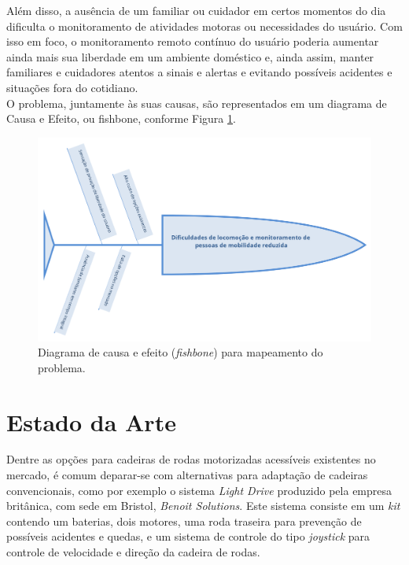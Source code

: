 Além disso, a ausência de um familiar ou cuidador em certos momentos 
do dia 
dificulta o monitoramento de atividades motoras ou necessidades 
do usuário. 
Com isso em foco, o monitoramento remoto contínuo do usuário 
poderia 
aumentar ainda mais sua liberdade em um ambiente doméstico e, ainda 
assim, 
manter familiares e cuidadores atentos a sinais e alertas e evitando 
possíveis 
acidentes e situações fora do cotidiano.\\
	
O problema, juntamente às suas causas, são representados em um diagrama 
de Causa e Efeito, ou fishbone, conforme Figura \ref{fishbone}.
	
\begin{figure}[h]
    \centering
    \label{fishbone}
    \includegraphics[scale=0.5]{figuras/fishbone.png}
    \caption{Diagrama de causa e efeito (\textit{fishbone}) para mapeamento do problema.}
\end{figure}


\section{Estado da Arte}

Dentre as opções para cadeiras de rodas motorizadas acessíveis existentes no mercado,
é comum deparar-se com alternativas para adaptação de cadeiras convencionais,
como por exemplo o sistema \textit{Light Drive} produzido pela empresa britânica, 
com sede em Bristol, \textit{Benoit Solutions}. Este sistema consiste em um \textit{kit}
contendo um baterias, dois motores, uma roda traseira para prevenção de possíveis
acidentes e quedas, e um sistema de controle do tipo \textit{joystick}
para controle de velocidade e direção da cadeira de rodas.\\

